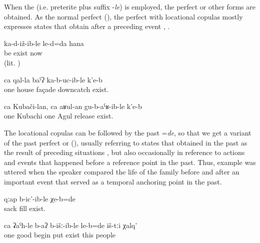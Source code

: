 When the  (i.e. preterite plus suffix -\textit{le}) is employed, the perfect or other forms are obtained. As the normal perfect (), the perfect with locational copulas mostly expresses states that obtain after a preceding event , .
%
\begin{exe}
	\ex	\label{ex:‎(Then I relaxed) and we lived normally}
	\gll	ka-d-iž-ib-le	le-d=da	hana\\
		be	exist	now\\
	\glt	{} (lit. )

	\ex	\label{ex:(The plant) has covered one wall of the house (by growing upwards).}
	\gll	ca	qal-la	baˁʔ	ka-b-uc-ib-le	k'e-b\\
		one	house	façade	downcatch	exist.\\
	\glt	{}
	
		\ex	\label{ex:‎One Kubachi person, one Agul person are buried (in Sanzhi)}
	\gll	ca	Kubači-lan,	ca	aʁul-an	gu-b-aˁʁ-ib-le	k'e-b\\
		one	Kubachi	one	Agul	release	exist.\\
	\glt	{}
\end{exe}


The locational copulas can be followed by the past  =\textit{de}, so that we get a variant of the past perfect or  (), usually referring to states that obtained in the past as the result of preceding situations , but also occasionally in reference to actions and events that happened before a reference point in the past. Thus, example  was uttered when the speaker compared the life of the family before and after an important event that served as a temporal anchoring point in the past.
%
\begin{exe}
	\ex	\label{ex:The sack was full filled}
	\gll	qːap	b-ic'-ib-le	χe-b=de\\
		sack	fill	exist.\\
	\glt	{}

	\ex	\label{ex:The people started well}
	\gll	ca	ʡaˁħ-le	b-aʔ	b-išː-ib-le	le-b=de	iš-tːi	χalq'\\
		one	good	begin	put	exist	this	people\\
	\glt	{}
\end{exe}

